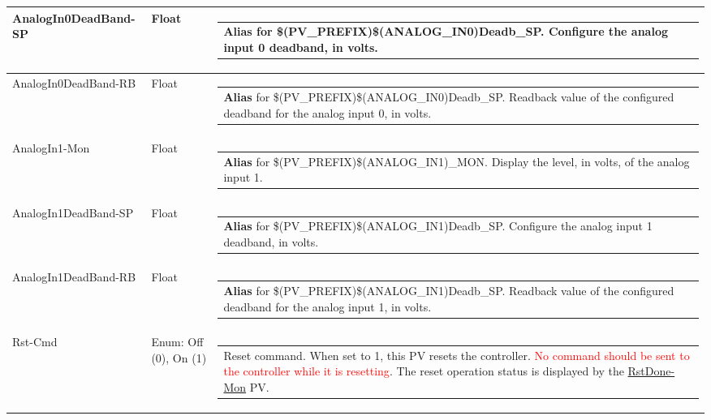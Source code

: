 \documentclass[openany]{article}
\begin{document}
\begin{longtable}{| m{4.5cm} m{2.5cm}  m{8.5cm} |}
        AnalogIn0DeadBand-SP & Float & \begin{tabular}{@{}m{6cm}@{}}
                \textbf{\color{blue} Alias} for \$(PV\_PREFIX)\$(ANALOG\_IN0)Deadb\_SP. Configure the analog input 0 deadband, in volts.
            \end{tabular} \hypertarget{}{}\\ \hline
        AnalogIn0DeadBand-RB & Float & \begin{tabular}{@{}m{6cm}@{}}
                \textbf{\color{blue} Alias} for \$(PV\_PREFIX)\$(ANALOG\_IN0)Deadb\_SP. Readback value of the configured deadband for the analog input 0, in volts.
            \end{tabular} \hypertarget{pv:analog-in-1-mon}{}\\ \hline
        AnalogIn1-Mon & Float & \begin{tabular}{@{}m{6cm}@{}}
                \textbf{\color{blue} Alias} for \$(PV\_PREFIX)\$(ANALOG\_IN1)\_MON. Display the level, in volts, of the analog input 1.
            \end{tabular} \hypertarget{pv:analog-in-1-dead-band}{}\\ \hline
        AnalogIn1DeadBand-SP & Float & \begin{tabular}{@{}m{6cm}@{}}
                \textbf{\color{blue} Alias} for \$(PV\_PREFIX)\$(ANALOG\_IN1)Deadb\_SP. Configure the analog input 1 deadband, in volts.
            \end{tabular} \hypertarget{}{}\\ \hline
        AnalogIn1DeadBand-RB & Float & \begin{tabular}{@{}m{6cm}@{}}
                \textbf{\color{blue} Alias} for \$(PV\_PREFIX)\$(ANALOG\_IN1)Deadb\_SP. Readback value of the configured deadband for the analog input 1, in volts.
            \end{tabular} \hypertarget{pv:rst-cmd}{}\\ \hline
        Rst-Cmd & Enum: Off (0), On (1) & \begin{tabular}{@{}m{6cm}@{}}
                Reset command. When set to 1, this PV resets the controller. \textcolor{red}{No command should be sent to the controller while it is resetting}. The reset operation status is displayed by the \hyperlink{pv:rst-done-mon}{RstDone-Mon} PV.
            \end{tabular} \hypertarget{pv:rst-done-mon}{}\\ \hline

\end{longtable}
\end{document}
